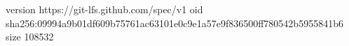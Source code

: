 version https://git-lfs.github.com/spec/v1
oid sha256:09994a9b01df609b75761ac63101e0c9e1a57e9f836500ff780542b5955841b6
size 108532
